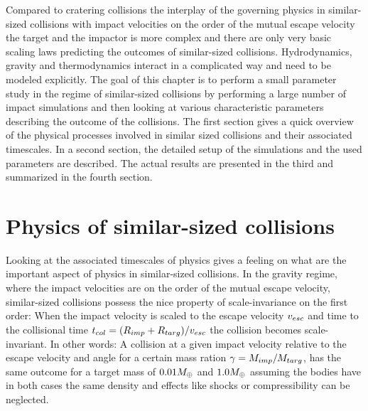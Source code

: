 Compared to cratering collisions the interplay of the governing physics in similar-sized collisions with impact velocities on the order of the mutual escape velocity the target and the impactor is more complex and there are only very basic scaling laws predicting the outcomes of similar-sized collisions. Hydrodynamics, gravity and thermodynamics interact in a complicated way and need to be modeled explicitly. The goal of this chapter is to perform a small parameter study in the regime of similar-sized collisions by performing a large number of impact simulations and then looking at various characteristic parameters describing the outcome of the collisions. The first section gives a quick overview of the physical processes involved in similar sized collisions and their associated timescales. In a second section, the detailed setup of the simulations and the used parameters are described. The actual results are presented in the third and summarized in the fourth section.

\section{Physics of similar-sized collisions}
Looking at the associated timescales of physics gives a feeling on what are the important aspect of physics in similar-sized collisions. In the gravity regime, where the impact velocities are on the order of the mutual escape velocity, similar-sized collisions possess the nice property of scale-invariance on the first order: When the impact velocity is scaled to the escape velocity $v_{esc}$ and time to the collisional time $t_{col} = ( R_{imp} + R_{targ} ) / v_{esc}$ the collision becomes scale-invariant. In other words: A collision at a given impact velocity relative to the escape velocity and angle for a certain mass ration $\gamma = M_{imp} / M_{targ}$, has the same outcome for a target mass of $0.01 M_{\oplus}$ and $1.0 M_{\oplus}$ assuming the bodies have in both cases the same density and effects like shocks or compressibility can be neglected.

